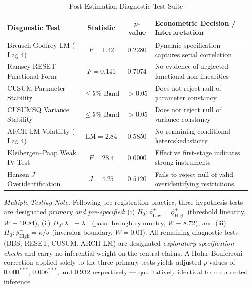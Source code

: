 \documentclass[review,12pt]{elsarticle}
\begin{document}
\begin{table}[htbp]
\centering
\small
\renewcommand{\arraystretch}{1.15}
\caption{Post-Estimation Diagnostic Test Suite}
\label{tab:post_diag}
\begin{threeparttable}
\begin{tabularx}{\textwidth}{l cc L}
\toprule
\textbf{Diagnostic Test} & \textbf{Statistic} & \textbf{$p$-value} & \textbf{Econometric Decision / Interpretation} \\
\midrule
Breusch-Godfrey LM ($\text{Lag } 4$) & $F=1.42$ & $0.2280$ & Dynamic specification captures serial correlation \\
Ramsey RESET Functional Form & $F=0.141$ & $0.7074$ & No evidence of neglected functional non-linearities \\
CUSUM Parameter Stability & $\le 5\%\text{ Band}$ & $>0.05$ & Does not reject null of parameter constancy \\
CUSUMSQ Variance Stability & $\le 5\%\text{ Band}$ & $>0.05$ & Does not reject null of variance constancy \\
ARCH-LM Volatility ($\text{Lag } 4$) & $\text{LM}=2.84$ & $0.5850$ & No remaining conditional heteroskedasticity \\
Kleibergen--Paap Weak IV Test & $F=28.4$ & $0.0000$ & Effective first-stage indicates strong instruments \\
Hansen $J$ Overidentification & $J=4.25$ & $0.5120$ & Fails to reject null of valid overidentifying restrictions \\
\bottomrule
\end{tabularx}
\begin{tablenotes}
\footnotesize
\item \textit{Multiple Testing Note:} Following pre-registration practice, three hypothesis tests are designated \textit{primary and pre-specified}: (i) $H_0: \phi_{\text{Low}}^+ = \phi_{\text{High}}^+$ (threshold linearity, $W=19.84$), (ii) $H_0: \lambda^+ = \lambda^-$ (pass-through symmetry, $W=8.72$), and (iii) $H_0: \phi_{\text{High}}^+ = \kappa/\sigma$ (inversion boundary, $W=0.01$). All remaining diagnostic tests (BDS, RESET, CUSUM, ARCH-LM) are designated \textit{exploratory specification checks} and carry no inferential weight on the central claims. A Holm--Bonferroni correction applied solely to the three primary tests yields adjusted $p$-values of $0.000^{***}$, $0.006^{***}$, and $0.932$ respectively --- qualitatively identical to uncorrected inference.
\end{tablenotes}
\end{threeparttable}
\end{table}
\end{document}
